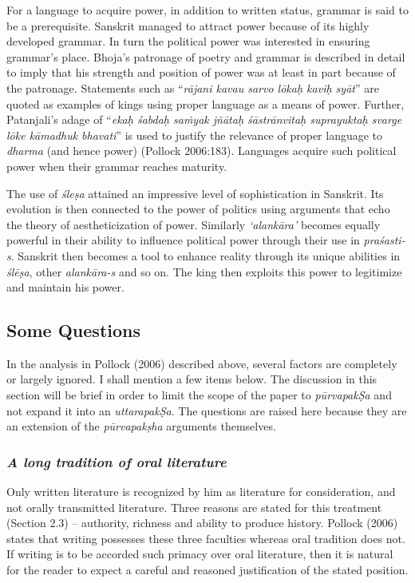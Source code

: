 For a language to acquire power, in addition to written status, grammar is said to be a prerequisite. Sanskrit managed to attract power because of its highly developed grammar. In turn the political power was interested in ensuring grammar’s place. Bhoja’s patronage of poetry and grammar is described in detail to imply that his strength and position of power was at least in part because of the patronage. Statements such as “{\sl rājani kavau sarvo lōkaḥ kaviḥ syāt}” are quoted as examples of kings using proper language as a means of power. Further, Patanjali’s adage of “{\sl ekaḥ śabdaḥ saṁyak jñātaḥ śāstrānvitaḥ suprayuktaḥ svarge lōke kāmadhuk bhavati}” is used to justify the relevance of proper language to {\sl dharma} (and hence power) (Pollock 2006:183). Languages acquire such political power when their grammar reaches maturity.

The use of {\sl śleṣa} attained an impressive level of sophistication in Sanskrit. Its evolution is then connected to the power of politics using arguments that echo the theory of aestheticization of power. Similarly {\sl `alankāra'} becomes equally powerful in their ability to influence political power through their use in {\sl praśasti-s}. Sanskrit then becomes a tool to enhance reality through its unique abilities in {\sl ślēṣa}, other {\sl alankāra-s} and so on. The king then exploits this power to legitimize and maintain his power.

\subsection{Some Questions}

In the analysis in Pollock (2006) described above, several factors are completely or largely ignored. I shall mention a few items below. The discussion in this section will be brief in order to limit the scope of the paper to {\sl pūrvapakṢa} and not expand it into an {\sl uttarapakṢa}. The questions are raised here because they are an extension of the {\sl pūrvapakṣha} arguments themselves. 

\subsubsection{{\sl A long tradition of oral literature}}

Only written literature is recognized by him as literature for consideration, and not orally transmitted literature. Three reasons are stated for this treatment (Section 2.3) – authority, richness and ability to produce history. Pollock (2006) states that writing possesses these three faculties whereas oral tradition does not. If writing is to be accorded such primacy over oral literature, then it is natural for the reader to expect a careful and reasoned justification of the stated position.

